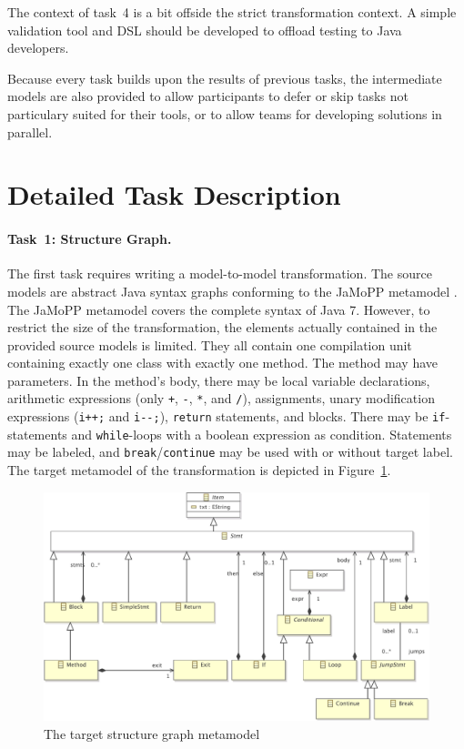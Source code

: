 \documentclass[submission]{eptcs}
\begin{document}
The context of task~4 is a bit offside the strict transformation context.  A
simple validation tool and DSL should be developed to offload testing to Java
developers.

Because every task builds upon the results of previous tasks, the intermediate
models are also provided to allow participants to defer or skip tasks not
particulary suited for their tools, or to allow teams for developing solutions
in parallel.

\section{Detailed Task Description}
\label{sec:task-descr}

\paragraph{Task~1: Structure Graph.}
\label{sec:task1-structure-graph}

The first task requires writing a model-to-model transformation.  The source
models are abstract Java syntax graphs conforming to the JaMoPP metamodel
\cite{jamopp09}.  The JaMoPP metamodel covers the complete syntax of Java 7.
However, to restrict the size of the transformation, the elements actually
contained in the provided source models is limited.  They all contain one
compilation unit containing exactly one class with exactly one method.  The
method may have parameters.  In the method's body, there may be local variable
declarations, arithmetic expressions (only \verb|+|, \verb|-|, \verb|*|, and
\verb|/|), assignments, unary modification expressions (\verb|i++;| and
\verb|i--;|), \verb|return| statements, and blocks.  There may be
\verb|if|-statements and \verb|while|-loops with a boolean expression as
condition.  Statements may be labeled, and \verb|break|/\verb|continue| may be
used with or without target label.  The target metamodel of the transformation
is depicted in Figure~\ref{fig:structure-graph-mm}.

\begin{figure}[h!]
  \centering
  \includegraphics[width=.9\linewidth]{StructureGraph}
  \caption{The target structure graph metamodel}
  \label{fig:structure-graph-mm}
\end{figure}
\end{document}
